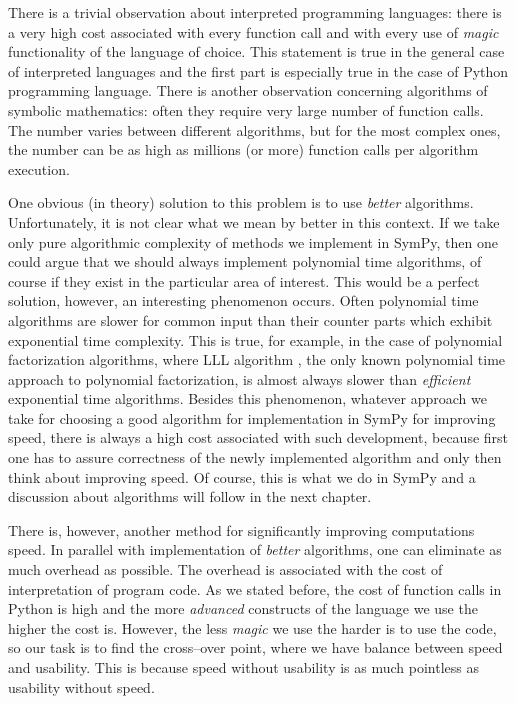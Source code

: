 There is a trivial observation about interpreted programming languages: there is a very high cost
associated with every function call and with every use of \emph{magic} functionality of the language of
choice. This statement is true in the general case of interpreted languages and the first part is
especially true in the case of Python programming language. There is another observation concerning
algorithms of symbolic mathematics: often they require very large number of function calls. The number
varies between different algorithms, but for the most complex ones, the number can be as high as millions
(or more) function calls per algorithm execution.

One obvious (in theory) solution to this problem is to use \emph{better} algorithms. Unfortunately, it
is not clear what we mean by better in this context. If we take only pure algorithmic complexity
of methods we implement in SymPy, then one could argue that we should always implement polynomial
time algorithms, of course if they exist in the particular area of interest. This would be a perfect
solution, however, an interesting phenomenon occurs. Often polynomial time algorithms are slower for
common input than their counter parts which exhibit exponential time complexity. This is true, for
example, in the case of polynomial factorization algorithms, where LLL algorithm \cite{Lenstra1982factor},
the only known polynomial time approach to polynomial factorization, is almost always slower than
\emph{efficient} exponential time algorithms. Besides this phenomenon, whatever approach we take for choosing
a good algorithm for implementation in SymPy for improving speed, there is always a high cost associated
with such development, because first one has to assure correctness of the newly implemented algorithm and
only then think about improving speed. Of course, this is what we do in SymPy and a discussion about
algorithms will follow in the next chapter.

There is, however, another method for significantly improving computations speed. In parallel with
implementation of \emph{better} algorithms, one can eliminate as much overhead as possible. The overhead
is associated with the cost of interpretation of program code. As we stated before, the cost of
function calls in Python is high and the more \emph{advanced} constructs of the language we use the
higher the cost is. However, the less \emph{magic} we use the harder is to use the code, so our task
is to find the cross--over point, where we have balance between speed and usability. This is
because speed without usability is as much pointless as usability without speed.

